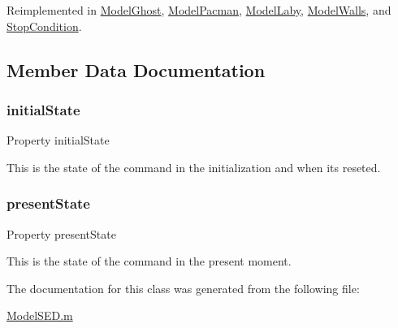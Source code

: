 Reimplemented in \hyperlink{class_model_ghost_a3140f24c6c4b80037b7d4f521c6ae2d3}{Model\+Ghost}, \hyperlink{class_model_pacman_a3140f24c6c4b80037b7d4f521c6ae2d3}{Model\+Pacman}, \hyperlink{class_model_laby_a3140f24c6c4b80037b7d4f521c6ae2d3}{Model\+Laby}, \hyperlink{class_model_walls_a3140f24c6c4b80037b7d4f521c6ae2d3}{Model\+Walls}, and \hyperlink{class_stop_condition_a3140f24c6c4b80037b7d4f521c6ae2d3}{Stop\+Condition}.



\subsection{Member Data Documentation}
\mbox{\label{class_model_s_e_d_acd9263acfa96c9138afdf497e55acc24}} 
\subsubsection{\texorpdfstring{initial\+State}{initialState}}
{\footnotesize\ttfamily Property initial\+State}



This is the state of the command in the initialization and when it\textquotesingle{}s reseted. 

\mbox{\label{class_model_s_e_d_a9624cc7c421a50fa5086b0ebd0cd5fe3}} 
\subsubsection{\texorpdfstring{present\+State}{presentState}}
{\footnotesize\ttfamily Property present\+State}



This is the state of the command in the present moment. 



The documentation for this class was generated from the following file\+:\begin{DoxyCompactItemize}
\item 
\hyperlink{_model_s_e_d_8m}{Model\+S\+E\+D.\+m}\end{DoxyCompactItemize}
